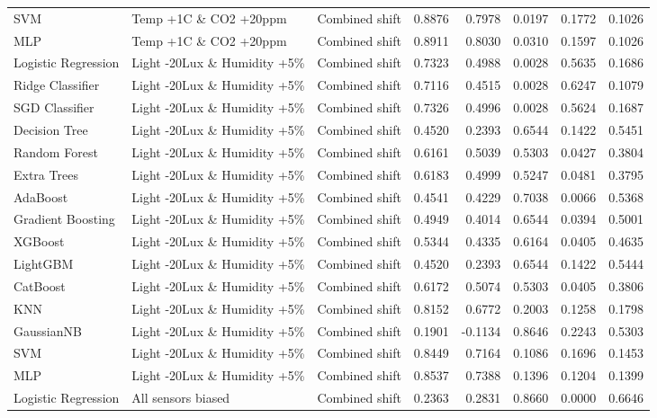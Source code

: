 \begin{tabular}{lllrrrrr}
SVM & Temp +1C \& CO2 +20ppm & Combined shift & 0.8876 & 0.7978 & 0.0197 & 0.1772 & 0.1026 \\
MLP & Temp +1C \& CO2 +20ppm & Combined shift & 0.8911 & 0.8030 & 0.0310 & 0.1597 & 0.1026 \\
Logistic Regression & Light -20Lux \& Humidity +5\% & Combined shift & 0.7323 & 0.4988 & 0.0028 & 0.5635 & 0.1686 \\
Ridge Classifier & Light -20Lux \& Humidity +5\% & Combined shift & 0.7116 & 0.4515 & 0.0028 & 0.6247 & 0.1079 \\
SGD Classifier & Light -20Lux \& Humidity +5\% & Combined shift & 0.7326 & 0.4996 & 0.0028 & 0.5624 & 0.1687 \\
Decision Tree & Light -20Lux \& Humidity +5\% & Combined shift & 0.4520 & 0.2393 & 0.6544 & 0.1422 & 0.5451 \\
Random Forest & Light -20Lux \& Humidity +5\% & Combined shift & 0.6161 & 0.5039 & 0.5303 & 0.0427 & 0.3804 \\
Extra Trees & Light -20Lux \& Humidity +5\% & Combined shift & 0.6183 & 0.4999 & 0.5247 & 0.0481 & 0.3795 \\
AdaBoost & Light -20Lux \& Humidity +5\% & Combined shift & 0.4541 & 0.4229 & 0.7038 & 0.0066 & 0.5368 \\
Gradient Boosting & Light -20Lux \& Humidity +5\% & Combined shift & 0.4949 & 0.4014 & 0.6544 & 0.0394 & 0.5001 \\
XGBoost & Light -20Lux \& Humidity +5\% & Combined shift & 0.5344 & 0.4335 & 0.6164 & 0.0405 & 0.4635 \\
LightGBM & Light -20Lux \& Humidity +5\% & Combined shift & 0.4520 & 0.2393 & 0.6544 & 0.1422 & 0.5444 \\
CatBoost & Light -20Lux \& Humidity +5\% & Combined shift & 0.6172 & 0.5074 & 0.5303 & 0.0405 & 0.3806 \\
KNN & Light -20Lux \& Humidity +5\% & Combined shift & 0.8152 & 0.6772 & 0.2003 & 0.1258 & 0.1798 \\
GaussianNB & Light -20Lux \& Humidity +5\% & Combined shift & 0.1901 & -0.1134 & 0.8646 & 0.2243 & 0.5303 \\
SVM & Light -20Lux \& Humidity +5\% & Combined shift & 0.8449 & 0.7164 & 0.1086 & 0.1696 & 0.1453 \\
MLP & Light -20Lux \& Humidity +5\% & Combined shift & 0.8537 & 0.7388 & 0.1396 & 0.1204 & 0.1399 \\
Logistic Regression & All sensors biased & Combined shift & 0.2363 & 0.2831 & 0.8660 & 0.0000 & 0.6646 \\

\end{tabular}
